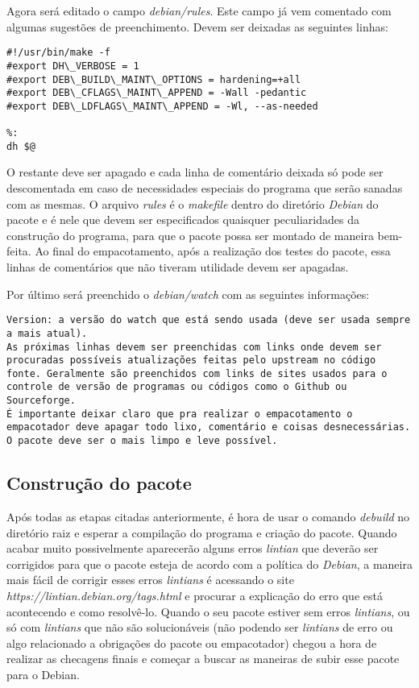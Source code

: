 Agora será editado o campo \textit{debian/rules}. Este campo já vem comentado com algumas sugestões de preenchimento. Devem ser deixadas as seguintes linhas:
\begin{verbatim}
#!/usr/bin/make -f
#export DH\_VERBOSE = 1
#export DEB\_BUILD\_MAINT\_OPTIONS = hardening=+all
#export DEB\_CFLAGS\_MAINT\_APPEND = -Wall -pedantic
#export DEB\_LDFLAGS\_MAINT\_APPEND = -Wl, --as-needed

%:
dh $@

\end{verbatim}
O restante deve ser apagado e cada linha de comentário deixada só pode ser descomentada em caso de necessidades especiais do programa que serão sanadas com as mesmas. O arquivo \textit{rules} é o \textit{makefile} dentro do diretório \textit{Debian} do pacote e é nele que devem ser especificados quaisquer peculiaridades da construção do programa, para que o pacote possa ser montado de maneira bem-feita. Ao final do empacotamento, após a realização dos testes do pacote, essa linhas de comentários que não tiveram utilidade devem ser apagadas.

Por último será preenchido o \textit{debian/watch} com as seguintes informações:
\begin{verbatim}
Version: a versão do watch que está sendo usada (deve ser usada sempre a mais atual).
As próximas linhas devem ser preenchidas com links onde devem ser procuradas possíveis atualizações feitas pelo upstream no código fonte. Geralmente são preenchidos com links de sites usados para o controle de versão de programas ou códigos como o Github ou Sourceforge.
É importante deixar claro que pra realizar o empacotamento o empacotador deve apagar todo lixo, comentário e coisas desnecessárias. O pacote deve ser o mais limpo e leve possível.
\end{verbatim}

\subsection{Construção do pacote}

Após todas as etapas citadas anteriormente, é hora de usar o comando \textit{debuild} no diretório raiz e esperar a compilação do programa e criação do pacote. Quando acabar muito possivelmente aparecerão alguns erros \textit{lintian} que deverão ser corrigidos para que o pacote esteja de acordo com a política do \textit{Debian}, a maneira mais fácil de corrigir esses erros \textit{lintians} é acessando o site \textit{https://lintian.debian.org/tags.html} e procurar a explicação do erro que está acontecendo e como resolvê-lo. Quando o seu pacote estiver sem erros \textit{lintians}, ou só com \textit{lintians} que não são solucionáveis (não podendo ser \textit{lintians} de erro ou algo relacionado a obrigações do pacote ou empacotador) chegou a hora de realizar as checagens finais e começar a buscar as maneiras de subir esse pacote para o Debian.

